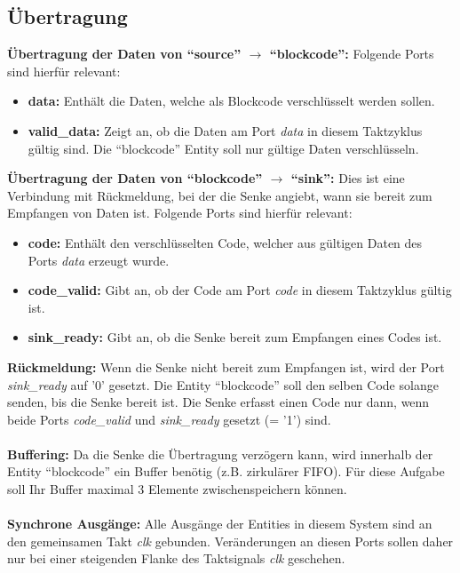 \documentclass[a4paper,12pt]{article}
\begin{document}
\newpage
\subsection*{\noindent \"Ubertragung}

\textbf{\"Ubertragung der Daten von "`source"' $\rightarrow$ "`blockcode"':} Folgende Ports sind hierf\"ur relevant:
\begin{itemize}
\item \textbf{data:} Enth\"alt die Daten, welche als Blockcode verschl\"usselt werden sollen.
\item \textbf{valid\_data:} Zeigt an, ob die Daten am Port \textit{data} in diesem Taktzyklus g\"ultig sind. Die "`blockcode"' Entity soll nur g\"ultige Daten verschl\"usseln.
\end{itemize}

\textbf{\"Ubertragung der Daten von "`blockcode"' $\rightarrow$ "`sink"':} Dies ist eine Verbindung mit R\"uckmeldung, bei der die Senke angiebt, wann sie bereit zum Empfangen von Daten ist. Folgende Ports sind hierf\"ur relevant:
\begin{itemize}
\item \textbf{code:} Enth\"alt den verschl\"usselten Code, welcher aus g\"ultigen Daten des Ports \textit{data} erzeugt wurde.
\item \textbf{code\_valid:} Gibt an, ob der Code am Port \textit{code}  in diesem Taktzyklus g\"ultig ist.
\item \textbf{sink\_ready:} Gibt an, ob die Senke bereit zum Empfangen eines Codes ist.
\end{itemize}

\textbf{R\"uckmeldung:} Wenn die Senke nicht bereit zum Empfangen ist, wird der Port \textit{sink\_ready} auf '0' gesetzt. Die Entity "`blockcode"' soll den selben Code solange senden, bis die Senke bereit ist. Die Senke erfasst einen Code nur dann, wenn beide Ports \textit{code\_valid} und \textit{sink\_ready} gesetzt (= '1') sind.\\
\\
\textbf{Buffering:} Da die Senke die \"Ubertragung verz\"ogern kann, wird innerhalb der Entity "`blockcode"' ein Buffer ben\"otig (z.B. zirkul\"arer FIFO). F\"ur diese Aufgabe soll Ihr Buffer maximal 3 Elemente zwischenspeichern k\"onnen. \\
\\
\textbf{Synchrone Ausg\"ange:} Alle Ausg\"ange der Entities in diesem System sind an den gemeinsamen Takt \textit{clk} gebunden. Ver\"anderungen an diesen Ports sollen daher nur bei einer steigenden Flanke des Taktsignals \textit{clk} geschehen.\\
\end{document}
